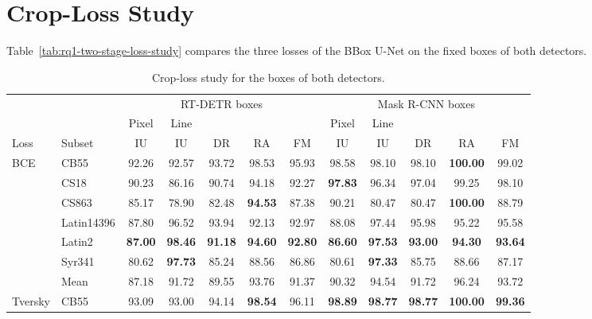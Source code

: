 \FloatBarrier
\section{Crop-Loss Study}
\label{app:rq1-crop-loss}\label{app:rq1-two-stage-loss}\label{app:rq1-maskrcnn-loss}

Table~\ref{tab:rq1-two-stage-loss-study} compares the three losses of the BBox U-Net on the fixed boxes of both detectors.

\begin{table}[htbp]
    \centering
    \scriptsize
    \setlength{\tabcolsep}{1.3pt}
    \renewcommand{\arraystretch}{0.92}
    \caption{Crop-loss study for the boxes of both detectors.}
    \label{tab:rq1-two-stage-loss-study}\label{tab:rq1-two-stage-loss-study-average}\label{tab:rq1-maskrcnn-loss-study}\label{tab:rq1-maskrcnn-loss-study-average}
    \begin{tabular*}{\textwidth}{@{\extracolsep{\fill}}ll*{10}{c}@{}}
        \toprule
        & & \multicolumn{5}{c}{RT-DETR boxes} & \multicolumn{5}{c}{Mask R-CNN boxes} \\
        \cmidrule(lr){3-7}\cmidrule(l){8-12}
        & & Pixel & Line & & & & Pixel & Line & & & \\
        Loss & Subset & IU & IU & DR & RA & FM & IU & IU & DR & RA & FM \\
        \midrule
        BCE & CB55 & 92.26 & 92.57 & 93.72 & 98.53 & 95.93 & 98.58 & 98.10 & 98.10 & \textbf{100.00} & 99.02 \\
         & CS18 & 90.23 & 86.16 & 90.74 & 94.18 & 92.27 & \textbf{97.83} & 96.34 & 97.04 & 99.25 & 98.10 \\
         & CS863 & 85.17 & 78.90 & 82.48 & \textbf{94.53} & 87.38 & 90.21 & 80.47 & 80.47 & \textbf{100.00} & 88.79 \\
         & Latin14396 & 87.80 & 96.52 & 93.94 & 92.13 & 92.97 & 88.08 & 97.44 & 95.98 & 95.22 & 95.58 \\
         & Latin2 & \textbf{87.00} & \textbf{98.46} & \textbf{91.18} & \textbf{94.60} & \textbf{92.80} & \textbf{86.60} & \textbf{97.53} & \textbf{93.00} & \textbf{94.30} & \textbf{93.64} \\
         & Syr341 & 80.62 & \textbf{97.73} & 85.24 & 88.56 & 86.86 & 80.61 & \textbf{97.33} & 85.75 & 88.66 & 87.17 \\
        \addlinespace[1pt]
         & Mean & 87.18 & 91.72 & 89.55 & 93.76 & 91.37 & 90.32 & 94.54 & 91.72 & 96.24 & 93.72 \\
        \midrule
        Tversky & CB55 & 93.09 & 93.00 & 94.14 & \textbf{98.54} & 96.11 & \textbf{98.89} & \textbf{98.77} & \textbf{98.77} & \textbf{100.00} & \textbf{99.36} \\

\end{tabular*}
\end{table}
